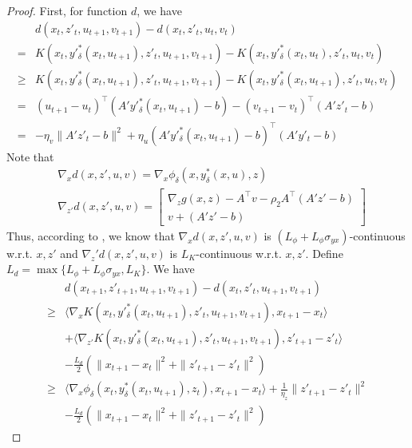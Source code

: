\documentclass{article}
\theoremstyle{plain}
\theoremstyle{definition}
\theoremstyle{remark}
\begin{document}
\begin{proof}
    
First, for function $d$, we have
\begin{align*}
    &d(x_t, z'_t, u_{t+1}, v_{t+1})-d(x_t, z'_t, u_t, v_t)\\
    =&K(x_t, y'^*_\delta(x_t, u_{t+1}), z'_t, u_{t+1}, v_{t+1})-K(x_t,y'^*_\delta(x_t, u_{t}), z'_t, u_t, v_t)\\
    \geq&K(x_t, y'^*_\delta(x_t, u_{t+1}), z'_t, u_{t+1}, v_{t+1})-K(x_t,y'^*_\delta(x_t, u_{t+1}), z'_t, u_t, v_t)\\
    =& (u_{t+1}-u_t)^\top(A'y'^*_\delta(x_t,u_{t+1})-b)-(v_{t+1}-v_t)^\top(A'z'_t-b)\\
    =&-\eta_v\|A'z'_t-b\|^2+\eta_u(A'y'^*_\delta(x_t,u_{t+1})-b)^\top(A'y'_t-b)
\end{align*}
Note that
\begin{align*}
    &\nabla_x d(x, z',u,v)=\nabla_x \phi_\delta(x, y^*_\delta(x, u), z)\\
    &\nabla_{z'} d(x, z',u,v)=\begin{bmatrix}
    \nabla_z g(x,z)-A^\top v-\rho_2A^\top (A'z'-b)\\
    v+(A'z'-b)
    \end{bmatrix}
\end{align*}
Thus, according to , we know that
$\nabla_x d(x, z',u,v)$ is $(L_\phi+L_\phi\sigma_{yx})$-continuous w.r.t. $x,z'$ and $\nabla_z' d(x, z',u,v)$ is $L_K$-continuous w.r.t. $x,z'$. Define $L_d=\max\{L_\phi+L_\phi\sigma_{yx}, L_K\}$. We have
\begin{align*}
    &d(x_{t+1}, z'_{t+1}, u_{t+1}, v_{t+1})-d(x_t,z'_t, u_{t+1}, v_{t+1})\\
    \geq&\langle\nabla_x K(x_t, y'^*_\delta(x_t,u_{t+1}), z'_t, u_{t+1}, v_{t+1}), x_{t+1}-x_t\rangle\\
    &+\langle\nabla_{z'} K(x_t, y'^*_\delta(x_t,u_{t+1}), z'_t, u_{t+1},v_{t+1}), z'_{t+1}-z'_t\rangle\\
    &-\frac{L_d}{2}(\|x_{t+1}-x_t\|^2+\|z'_{t+1}-z'_t\|^2)\\
    \geq&\langle\nabla_x \phi_\delta(x_t, y_\delta^*(x_t,u_{t+1}), z_t), x_{t+1}-x_t\rangle+\frac{1}{\eta_z}\|z'_{t+1}-z'_t\|^2\\
    &-\frac{L_d}{2}(\|x_{t+1}-x_t\|^2+\|z'_{t+1}-z'_t\|^2)
\end{align*}


\end{proof}
\end{document}
